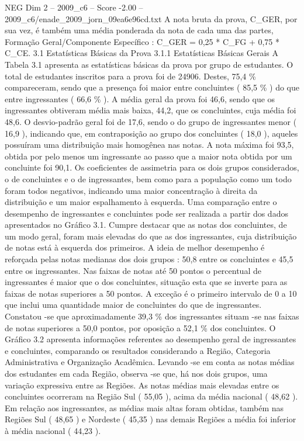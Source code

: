 \begin{textsample}{NEG Dim 2 – 2009\_c6 – Score -2.00 – 2009\_c6/enade\_2009\_jorn\_09ea6e96cd.txt}
A nota bruta da prova, C\_GER, por sua vez, é também uma média ponderada da nota de cada uma das partes, Formação Geral/Componente Específico : C\_GER = 0,25 * C\_FG + 0,75 * C\_CE. 3.1 Estatísticas Básicas da Prova 3.1.1 Estatísticas Básicas Gerais A Tabela 3.1 apresenta as estatísticas básicas da prova por grupo de estudantes.
O total de estudantes inscritos para a prova foi de 24906.
Destes, 75,4 \% compareceram, sendo que a presença foi maior entre concluintes ( 85,5 \% ) do que entre ingressantes ( 66,6 \% ).
A média geral da prova foi 46,6, sendo que os ingressantes obtiveram média mais baixa, 44,2, que os concluintes, cuja média foi 48,6.
O desvio-padrão geral foi de 17,6, sendo o do grupo de ingressantes menor ( 16,9 ), indicando que, em contraposição ao grupo dos concluintes ( 18,0 ), aqueles possuíram uma distribuição mais homogênea nas notas.
A nota máxima foi 93,5, obtida por pelo menos um ingressante ao passo que a maior nota obtida por um concluinte foi 90,1.
Os coeficientes de assimetria para os dois grupos considerados, o de concluintes e o de ingressantes, bem como para a população como um todo foram todos negativos, indicando uma maior concentração à direita da distribuição e um maior espalhamento à esquerda.
Uma comparação entre o desempenho de ingressantes e concluintes pode ser realizada a partir dos dados apresentados no Gráfico 3.1.
Cumpre destacar que as notas dos concluintes, de um modo geral, foram mais elevadas do que as dos ingressantes, cuja distribuição de notas está à esquerda dos primeiros.
A ideia de melhor desempenho é reforçada pelas notas medianas dos dois grupos : 50,8 entre os concluintes e 45,5 entre os ingressantes.
Nas faixas de notas até 50 pontos o percentual de ingressantes é maior que o dos concluintes, situação esta que se inverte para as faixas de notas superiores a 50 pontos.
A exceção é o primeiro intervalo de 0 a 10 que inclui uma quantidade maior de concluintes do que de ingressantes.
Constatou -se que aproximadamente 39,3 \% dos ingressantes situam -se nas faixas de notas superiores a 50,0 pontos, por oposição a 52,1 \% dos concluintes.
O Gráfico 3.2 apresenta informações referentes ao desempenho geral de ingressantes e concluintes, comparando os resultados considerando a Região, Categoria Administrativa e Organização Acadêmica.
Levando -se em conta as notas médias dos estudantes em cada Região, observa -se que, há nos dois grupos, uma variação expressiva entre as Regiões.
As notas médias mais elevadas entre os concluintes ocorreram na Região Sul ( 55,05 ), acima da média nacional ( 48,62 ).
Em relação aos ingressantes, as médias mais altas foram obtidas, também nas Regiões Sul ( 48,65 ) e Nordeste ( 45,35 ) nas demais Regiões a média foi inferior à média nacional ( 44,23 ).

\end{textsample}

